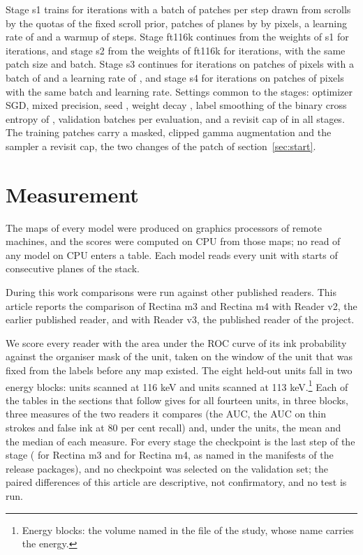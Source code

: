 Stage s1 trains for \IterSOne{} iterations with a batch of \BatchSOne{} patches per step drawn from \QuotaScrolls{} scrolls by the quotas of the fixed scroll prior, patches of \Planes{} planes by \PxSOne{} by \PxSOne{} pixels, a learning rate of \LrSOne{} and a warmup of \WarmSOne{} steps. Stage ft116k continues from the weights of s1 for \IterFT{} iterations, and stage s2 from the weights of ft116k for \IterSTwo{} iterations, with the same patch size and batch. Stage s3 continues for \IterSThree{} iterations on patches of \PxSThree{} pixels with a batch of \BatchSThree{} and a learning rate of \LrSThree{}, and stage s4 for \IterSFour{} iterations on patches of \PxSFour{} pixels with the same batch and learning rate. Settings common to the stages: optimizer SGD, mixed precision, seed \Seed{}, weight decay \WeightDecay{}, label smoothing of the binary cross entropy of \LabelSmooth{}, \ValSteps{} validation batches per evaluation, and a revisit cap of \RevisitCap{} in all stages. The training patches carry a masked, clipped gamma augmentation and the sampler a revisit cap, the two changes of the patch of section~\ref{sec:start}.

\section{Measurement}

The maps of every model were produced on graphics processors of remote machines, and the scores were computed on CPU from those maps; no read of any model on CPU enters a table. Each model reads every unit with \ReadStarts{} starts of \Planes{} consecutive planes of the stack.

During this work comparisons were run against other published readers. This article reports the comparison of Rectina m3 and Rectina m4 with Reader v2, the earlier published reader, and with Reader v3, the published reader of the project.

We score every reader with the area under the ROC curve of its ink probability against the organiser mask of the
unit, taken on the window of the unit that was fixed from the labels before any map existed. The eight held-out
units fall in two energy blocks: \BlockLongN{} units scanned at 116 keV and \BlockShortN{} units scanned at 113
keV.\footnote{Energy blocks: the volume named in the file  of the study, whose name carries the energy.} Each of the tables in the sections
that follow gives for all fourteen units, in three blocks, three measures of the two readers it compares (the
AUC, the AUC on thin strokes and false ink at 80 per cent recall) and, under the units, the mean and the median of
each measure. For every stage the checkpoint is the last step of the stage (\CkptThree{} for Rectina m3 and \CkptFour{} for Rectina m4, as named in the manifests of the release packages), and no checkpoint was selected on the validation set; the paired differences of this article are descriptive, not confirmatory, and no test is run.

